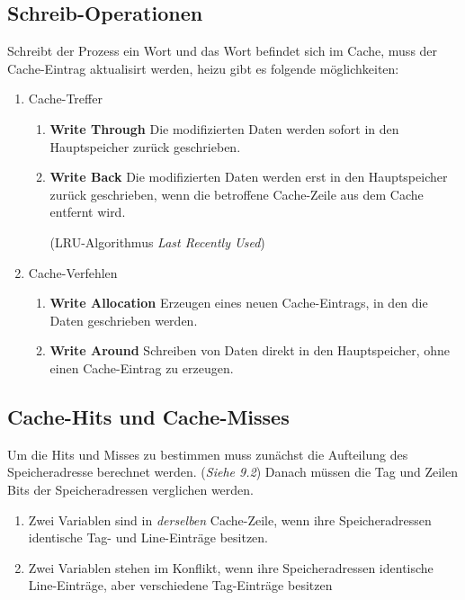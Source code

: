 \documentclass
[
	8pt,		%
	ngerman,	%
	a4paper,	%
	landscape,	%
	final		%
]{extarticle}
\begin{document}
\begin{multicols*}{4}
\subsection{Schreib-Operationen}
Schreibt der Prozess ein Wort und das Wort befindet sich im Cache, muss der
Cache-Eintrag aktualisirt werden, heizu gibt es folgende möglichkeiten:
\begin{enumerate}
	\item Cache-Treffer
	      \begin{enumerate}
		      \item\textbf{Write Through} Die modifizierten Daten werden
		            sofort in den Hauptspeicher zurück geschrieben.
		      \item\textbf{Write Back} Die modifizierten Daten werden erst
		            in den Hauptspeicher zurück geschrieben,
		            wenn die betroffene Cache-Zeile aus dem Cache entfernt
		            wird.\par (LRU-Algorithmus \emph{Last Recently Used})
	      \end{enumerate}
	\item Cache-Verfehlen
	      \begin{enumerate}
		      \item\textbf{Write Allocation} Erzeugen eines neuen
		            Cache-Eintrags, in den die Daten geschrieben werden.
		      \item\textbf{Write Around} Schreiben von Daten direkt in den
		            Hauptspeicher, ohne einen Cache-Eintrag zu erzeugen.
	      \end{enumerate}
\end{enumerate}
\subsection{Cache-Hits und Cache-Misses}
Um die Hits und Misses zu bestimmen muss zunächst die Aufteilung des Speicheradresse
berechnet werden. (\textit{Siehe 9.2}) Danach müssen die Tag und Zeilen Bits der
Speicheradressen verglichen werden. \par
\begin{enumerate}
	\item Zwei Variablen sind in \emph{derselben} Cache-Zeile, wenn ihre
	      Speicheradressen identische Tag- und Line-Einträge besitzen.
	\item Zwei Variablen stehen im Konflikt, wenn ihre Speicheradressen
	      identische Line-Einträge, aber verschiedene Tag-Einträge besitzen
\end{enumerate}

\end{multicols*}
\end{document}
